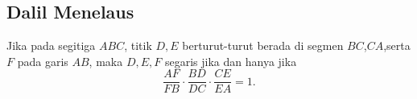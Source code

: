 \subsection{Dalil Menelaus}
Jika pada segitiga $ABC$, titik $D,E$ berturut-turut berada di segmen $BC$,$CA$,serta $F$ pada garis $AB$, maka $D,E,F$ segaris jika dan hanya jika
$$\dfrac{AF}{FB} \cdot \dfrac{BD}{DC} \cdot \dfrac{CE}{EA} = 1.$$

